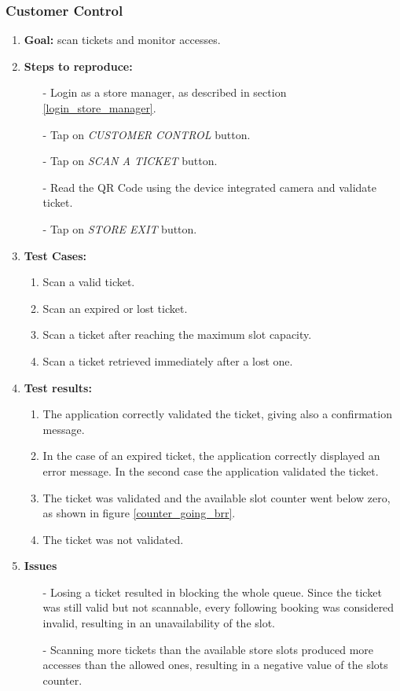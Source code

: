 \documentclass[table, 12pt]{article}
\begin{document}
\subsubsection{Customer Control}
\begin{enumerate}[i]
    \item \textbf{Goal:} scan tickets and monitor accesses.
    \item \textbf{Steps to reproduce:}
          \begin{itemize}
              \item[-] Login as a store manager, as described in section \ref{login_store_manager}.
              \item[-] Tap on \textit{CUSTOMER CONTROL} button.
              \item[-] Tap on \textit{SCAN A TICKET} button.
              \item[-] Read the QR Code using the device integrated camera and validate ticket.
              \item[-] Tap on \textit{STORE EXIT} button.
          \end{itemize}
    \item \textbf{Test Cases:}
          \begin{enumerate}
              \item Scan a valid ticket.
              \item Scan an expired or lost ticket.
              \item Scan a ticket after reaching the maximum slot capacity.
              \item Scan a ticket retrieved immediately after a lost one.
          \end{enumerate}
    \item \textbf{Test results:}
          \begin{enumerate}
              \item The application correctly validated the ticket, giving also a confirmation message.
              \item In the case of an expired ticket, the application correctly displayed an error message. In the second case the application validated the ticket.
              \item The ticket was validated and the available slot counter went below zero, as shown in figure \ref{counter_going_brr}.
              \item The ticket was not validated.
          \end{enumerate}
    \item \textbf{Issues}
          \begin{itemize}
              \item[-] Losing a ticket resulted in blocking the whole queue. Since the ticket was still valid but not scannable, every following booking was considered invalid, resulting in an unavailability of the slot.
              \item[-] Scanning more tickets than the available store slots produced more accesses than the allowed ones, resulting in a negative value of the slots counter.
          \end{itemize}
\end{enumerate}
\end{document}
